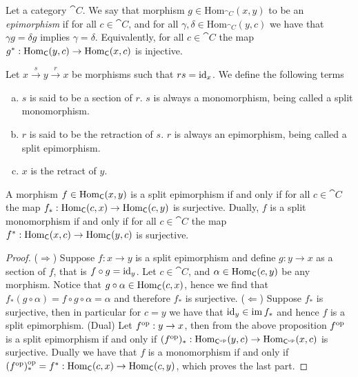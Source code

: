 \begin{definition}[Epimorphism]\label{def: epimorphism}
  Let a category \(\cat C\). We say that morphism \(g \in \mathrm{Hom}_{\cat
  C}(x, y)\) to be an \emph{epimorphism} if for all \(c \in \cat{C}\), and for
  all \(\gamma, \delta \in \mathrm{Hom}_{\cat C}(y, c)\) we have that \(\gamma g
  = \delta g\) implies \(\gamma = \delta\). Equivalently, for all \(c \in \cat
  C\) the map \(g^*: \operatorname{Hom}_{\mathsf C}(y, c)\to \operatorname{Hom}_{\mathsf C}(x, c)\) is injective.
\end{definition}

\begin{definition}
  Let \(x \xrightarrow s y \xrightarrow r x\) be morphisms such that \(r s =
  \operatorname{id}_x\). We define the following terms
  \begin{enumerate}[(a)]
    \item\label{def: split monomorphism}
      \(s\) is said to be a section of \(r\). \(s\) is always a monomorphism,
      being called a split monomorphism.
    \item\label{def: split epimorphism}
      \(r\) is said to be the retraction of \(s\). \(r\) is always an
      epimorphism, being called a split epimorphism.
    \item\label{def: retract}
      \(x\) is the retract of \(y\).
  \end{enumerate}
\end{definition}

\begin{proposition}
  A morphism \(f \in \operatorname{Hom}_{\mathsf C}(x, y)\) is a split epimorphism if and only if
  for all \(c \in \cat C\) the map \(f_*: \operatorname{Hom}_{\mathsf C}(c, x) \to \operatorname{Hom}_{\mathsf
    C}(c, y)\) is surjective. Dually, \(f\) is a split monomorphism if and only
    if for all \(c \in \cat C\) the map \(f^*: \operatorname{Hom}_{\mathsf C}(x, c) \to
    \operatorname{Hom}_{\mathsf C}(y, c)\) is surjective.
\end{proposition}

\begin{proof}
  (\(\Rightarrow\)) Suppose \(f: x \to y\) is a split epimorphism and define
  \(g: y \to x\) as a section of \(f\), that is \(f \circ g = \operatorname{id}_y\). Let \(c
  \in \cat C\), and \(\alpha \in \operatorname{Hom}_{\mathsf C}(c, y)\) be any morphism. Notice
  that \(g \circ \alpha \in \operatorname{Hom}_{\mathsf C}(c, x)\), hence we find that \(f_*(g
  \circ \alpha) = f \circ g \circ \alpha = \alpha\) and therefore \(f_*\) is
  surjective. (\(\Leftarrow\)) Suppose \(f_*\) is surjective, then in particular
  for \(c = y\) we have that \(\operatorname{id}_y \in \operatorname{im} f_*\) and hence \(f\) is a split
  epimorphism. (Dual) Let \(f^{\mathrm{op}}: y \to x\), then from the above proposition
  \(f^{\mathrm{op}}\) is a split epimorphism if and only if \((f^{\mathrm{op}})_*: \operatorname{Hom}_{\mathsf
  C^{\mathrm{op}}}(y, c) \to \operatorname{Hom}_{\mathsf C^{\mathrm{op}}}(x, c)\) is surjective. Dually we have that
  \(f\) is a monomorphism if and only if \((f^{\mathrm{op}})_*^{\mathrm{op}} = f^*: \operatorname{Hom}_{\mathsf C}(c,
  x) \to \operatorname{Hom}_{\mathsf C}(c, y)\), which proves the last part.
\end{proof}


